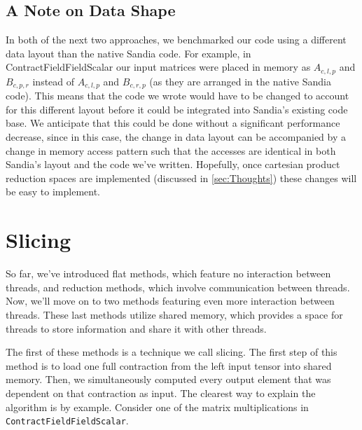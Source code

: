 
\subsection{A Note on Data Shape} \label{sec:DataShape}
In both of the next two approaches, we benchmarked our code using a different data layout than the native
Sandia code. For example, in ContractFieldFieldScalar our input matrices were placed in memory as $A_{c,l,p}$ and
$B_{c,p,r}$ instead of $A_{c,l,p}$ and $B_{c,r,p}$ (as they are arranged in the native Sandia code).
This means that the code we wrote would have to be changed to account for this different layout
before it could be integrated into Sandia's existing code base. We anticipate that this could be done without a
significant performance decrease, since in this case, the change in data layout can be accompanied by a change in 
memory access pattern such that the accesses are identical in both Sandia's layout and the code we've written.
Hopefully, once cartesian product reduction spaces are implemented (discussed in \ref{sec:Thoughts}) these 
changes will be easy to implement. 
\section{Slicing} \label{sec:Slicing}
So far, we've introduced flat methods, which feature no interaction between threads, and reduction
methods, which involve communication between threads. Now, we'll move on to two methods
featuring even more interaction between threads. These last methods utilize shared memory, 
which provides a space for threads to store information and share it with other threads. 

The first of these methods is a technique we call slicing. The first
step of this method is to load one full contraction from the left input tensor into
shared memory. Then, we simultaneously computed every output element that was
dependent on that contraction as input. The clearest way to explain the
algorithm is by example. Consider one of the matrix multiplications in
\texttt{ContractFieldFieldScalar}. 

